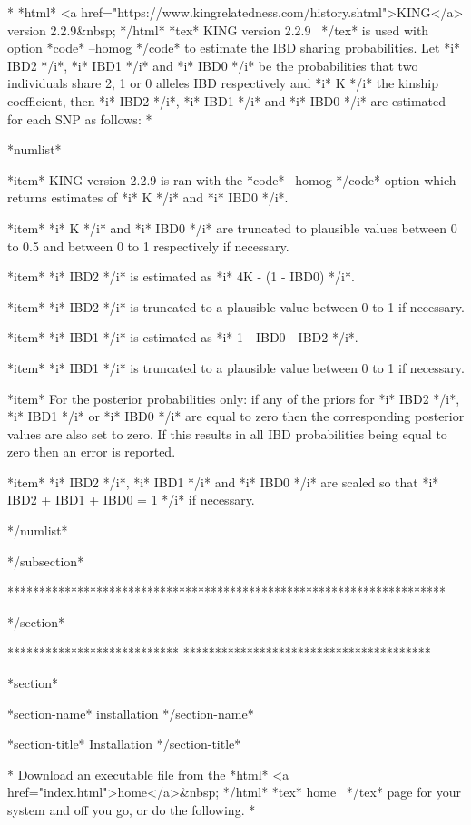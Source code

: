 *
*html* <a href="https://www.kingrelatedness.com/history.shtml">KING</a> version 2.2.9&nbsp; */html* *tex* KING version 2.2.9~ */tex* is used with option *code* --homog */code* to estimate the IBD sharing probabilities. Let *i* IBD2 */i*, *i* IBD1 */i* and *i* IBD0 */i* be the probabilities that two individuals share 2, 1 or 0 alleles IBD respectively and *i* K */i* the kinship coefficient, then *i* IBD2 */i*, *i* IBD1 */i* and *i* IBD0 */i* are estimated for each SNP as follows:
*

*numlist*

*item*
KING version 2.2.9 is ran with the *code* --homog */code* option which returns estimates of *i* K */i* and *i* IBD0 */i*.

*item*
*i* K */i* and *i* IBD0 */i* are truncated to plausible values between 0 to 0.5 and between 0 to 1 respectively if necessary.

*item*
*i* IBD2 */i* is estimated as *i* 4K - (1 - IBD0) */i*.

*item*
*i* IBD2 */i* is truncated to a plausible value between 0 to 1 if necessary.

*item*
*i* IBD1 */i* is estimated as *i* 1 - IBD0 - IBD2 */i*.

*item*
*i* IBD1 */i* is truncated to a plausible value between 0 to 1 if necessary.

*item*
For the posterior probabilities only: if any of the priors for *i* IBD2 */i*, *i* IBD1 */i* or *i* IBD0 */i* are equal to zero then the corresponding posterior values are also set to zero. If this results in all IBD probabilities being equal to zero then an error is reported.

*item*
*i* IBD2 */i*, *i* IBD1 */i* and *i* IBD0 */i* are scaled so that *i* IBD2 + IBD1 + IBD0 = 1 */i* if necessary.


*/numlist*

*/subsection*

*********************************************************************

*/section*

***************************
***************************************

*section*

*section-name* installation */section-name*

*section-title* Installation */section-title*

*
Download an executable file from the *html* <a href="index.html">home</a>&nbsp; */html* *tex* home~ */tex* page for your system and off you go, or do the following.
*

